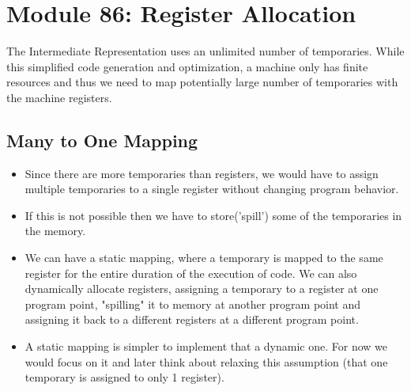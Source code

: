 \section{Module 86: Register Allocation}

The Intermediate Representation uses an unlimited number of temporaries. While this simplified code generation and optimization, a machine only has  finite resources and thus we need to map potentially large number of temporaries with the machine registers.

\subsection{Many to One Mapping}
\begin{itemize}
    \item Since there are more temporaries than registers, we would have to assign multiple temporaries to a single register without changing program behavior. 
    \item If this is not possible then we have to store('spill') some of the temporaries in the memory.
    \item We can have a static mapping, where a temporary is mapped to the same register for the entire duration of the execution of code. We can also dynamically allocate registers, assigning a temporary to a register at one program point, "spilling" it to memory at another program point and assigning it back to a different registers at a different program point.
    \item A static mapping is simpler to implement that a dynamic one. For now we would focus on it and later think about relaxing this assumption (that one temporary is assigned to only 1 register).
\end{itemize}
